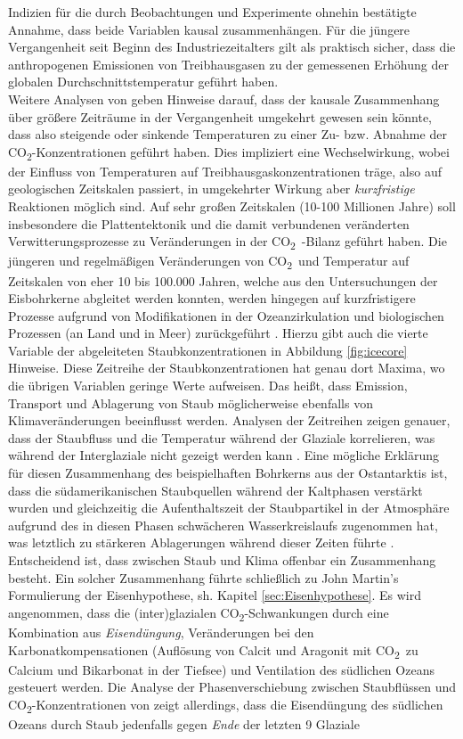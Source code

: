 \documentclass[12pt,a4paper,onecolumn,draft]{scrartcl}
\newcommand{\cotwo}{CO\textsubscript{2}}
\begin{document}
Indizien für die durch Beobachtungen und Experimente ohnehin bestätigte Annahme, dass beide Variablen kausal zusammenhängen. Für die jüngere Vergangenheit seit Beginn des Industriezeitalters gilt als praktisch sicher, dass die anthropogenen Emissionen von Treibhausgasen zu der gemessenen Erhöhung der globalen Durchschnittstemperatur geführt haben.  \\

Weitere Analysen von \citet{Stips.2016} geben Hinweise darauf, dass der kausale Zusammenhang über größere Zeiträume in der Vergangenheit umgekehrt gewesen sein könnte, dass also steigende oder sinkende Temperaturen zu einer Zu- bzw. Abnahme der \cotwo -Konzentrationen geführt haben. Dies impliziert eine Wechselwirkung, wobei der Einfluss von Temperaturen auf Treibhausgaskonzentrationen träge, also auf geologischen Zeitskalen passiert, in umgekehrter Wirkung aber \textit{kurzfristige} Reaktionen möglich sind.  Auf sehr großen Zeitskalen (10-100 Millionen Jahre) soll insbesondere die Plattentektonik und die damit verbundenen veränderten Verwitterungsprozesse zu Veränderungen in der \cotwo \ -Bilanz geführt haben. Die jüngeren und regelmäßigen Veränderungen von \cotwo \ und Temperatur auf Zeitskalen von eher 10 bis 100.000 Jahren, welche aus den Untersuchungen der Eisbohrkerne abgleitet werden konnten, werden hingegen auf kurzfristigere Prozesse aufgrund von Modifikationen in der Ozeanzirkulation und biologischen Prozessen (an Land und in Meer) zurückgeführt \citep{Emerson.2009}. Hierzu gibt auch die vierte Variable der abgeleiteten Staubkonzentrationen in Abbildung \ref{fig:icecore} Hinweise. Diese Zeitreihe der Staubkonzentrationen hat genau dort Maxima, wo die übrigen Variablen geringe Werte aufweisen. Das heißt, dass Emission, Transport und Ablagerung von Staub möglicherweise ebenfalls von Klimaveränderungen beeinflusst werden. Analysen der Zeitreihen zeigen genauer, dass der Staubfluss und die Temperatur während der Glaziale korrelieren, was während der Interglaziale nicht gezeigt werden kann \citep{Lambert.2008}. Eine mögliche Erklärung für diesen Zusammenhang des beispielhaften Bohrkerns aus der Ostantarktis ist, dass die südamerikanischen Staubquellen während der Kaltphasen verstärkt wurden und gleichzeitig die Aufenthaltszeit der Staubpartikel in der Atmosphäre aufgrund des in diesen Phasen schwächeren Wasserkreislaufs zugenommen hat, was letztlich zu stärkeren Ablagerungen während dieser Zeiten führte \citep{Lambert.2008}. Entscheidend ist, dass zwischen Staub und Klima offenbar ein Zusammenhang besteht. Ein solcher Zusammenhang führte schließlich zu John Martin's Formulierung der Eisenhypothese, sh. Kapitel \ref{sec:Eisenhypothese}. Es wird angenommen, dass die (inter)glazialen \cotwo -Schwankungen durch eine Kombination aus \textit{Eisendüngung}, Veränderungen bei den Karbonatkompensationen (Auflösung von Calcit und Aragonit mit  \cotwo \ zu Calcium und Bikarbonat in der Tiefsee) und Ventilation des südlichen Ozeans \citep{Lambert.2012} gesteuert werden. Die Analyse der Phasenverschiebung zwischen Staubflüssen und \cotwo -Konzentrationen von \citet{Lambert.2012} zeigt allerdings, dass die Eisendüngung des südlichen Ozeans durch Staub jedenfalls gegen \textit{Ende} der letzten 9 Glaziale 
\end{document}
